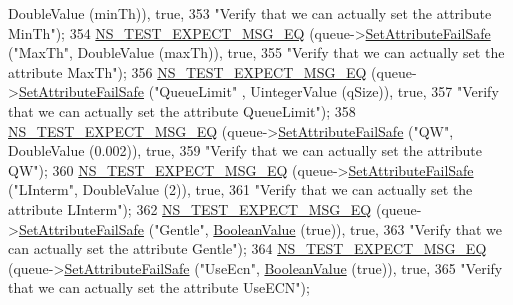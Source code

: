 \begin{DoxyCode}
      DoubleValue (minTh)), \textcolor{keyword}{true},
353                          \textcolor{stringliteral}{"Verify that we can actually set the attribute MinTh"});
354   \hyperlink{group__testing_ga7304ba46a28d8cf08dfdfd6499cf7068}{NS\_TEST\_EXPECT\_MSG\_EQ} (queue->\hyperlink{classns3_1_1ObjectBase_aa7d333004e970f925a4ed5df275541b5}{SetAttributeFailSafe} (\textcolor{stringliteral}{"MaxTh"}, 
      DoubleValue (maxTh)), \textcolor{keyword}{true},
355                          \textcolor{stringliteral}{"Verify that we can actually set the attribute MaxTh"});
356   \hyperlink{group__testing_ga7304ba46a28d8cf08dfdfd6499cf7068}{NS\_TEST\_EXPECT\_MSG\_EQ} (queue->\hyperlink{classns3_1_1ObjectBase_aa7d333004e970f925a4ed5df275541b5}{SetAttributeFailSafe} (\textcolor{stringliteral}{"QueueLimit"}
      , UintegerValue (qSize)), \textcolor{keyword}{true},
357                          \textcolor{stringliteral}{"Verify that we can actually set the attribute QueueLimit"});
358   \hyperlink{group__testing_ga7304ba46a28d8cf08dfdfd6499cf7068}{NS\_TEST\_EXPECT\_MSG\_EQ} (queue->\hyperlink{classns3_1_1ObjectBase_aa7d333004e970f925a4ed5df275541b5}{SetAttributeFailSafe} (\textcolor{stringliteral}{"QW"}, 
      DoubleValue (0.002)), \textcolor{keyword}{true},
359                          \textcolor{stringliteral}{"Verify that we can actually set the attribute QW"});
360   \hyperlink{group__testing_ga7304ba46a28d8cf08dfdfd6499cf7068}{NS\_TEST\_EXPECT\_MSG\_EQ} (queue->\hyperlink{classns3_1_1ObjectBase_aa7d333004e970f925a4ed5df275541b5}{SetAttributeFailSafe} (\textcolor{stringliteral}{"LInterm"}, 
      DoubleValue (2)), \textcolor{keyword}{true},
361                          \textcolor{stringliteral}{"Verify that we can actually set the attribute LInterm"});
362   \hyperlink{group__testing_ga7304ba46a28d8cf08dfdfd6499cf7068}{NS\_TEST\_EXPECT\_MSG\_EQ} (queue->\hyperlink{classns3_1_1ObjectBase_aa7d333004e970f925a4ed5df275541b5}{SetAttributeFailSafe} (\textcolor{stringliteral}{"Gentle"}, 
      \hyperlink{classns3_1_1BooleanValue}{BooleanValue} (\textcolor{keyword}{true})), \textcolor{keyword}{true},
363                          \textcolor{stringliteral}{"Verify that we can actually set the attribute Gentle"});
364   \hyperlink{group__testing_ga7304ba46a28d8cf08dfdfd6499cf7068}{NS\_TEST\_EXPECT\_MSG\_EQ} (queue->\hyperlink{classns3_1_1ObjectBase_aa7d333004e970f925a4ed5df275541b5}{SetAttributeFailSafe} (\textcolor{stringliteral}{"UseEcn"}, 
      \hyperlink{classns3_1_1BooleanValue}{BooleanValue} (\textcolor{keyword}{true})), \textcolor{keyword}{true},
365                          \textcolor{stringliteral}{"Verify that we can actually set the attribute UseECN"});

\end{DoxyCode}
